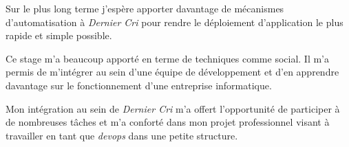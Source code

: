 \documentclass[12pt,a4paper]{article}
\begin{document}
  \bigskip

  Sur le plus long terme j'espère apporter davantage de mécanismes
  d'automatisation à \emph{Dernier Cri} pour rendre le déploiement
  d'application le plus rapide et simple possible.

  \bigskip

  Ce stage m'a beaucoup apporté en terme de techniques comme social. Il
  m'a permis de m'intégrer au sein d'une équipe de développement et d'en
  apprendre davantage sur le fonctionnement d'une entreprise informatique.

  \bigskip

  Mon intégration au sein de \emph{Dernier Cri} m'a offert l'opportunité
  de participer à de nombreuses tâches et m'a conforté dans mon projet
  professionnel visant à travailler en tant que \emph{devops} dans une
  petite structure.
\end{document}
